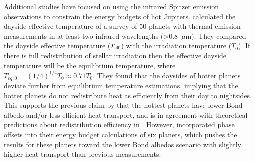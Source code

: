 Additional studies have focused on using the infrared Spitzer emission observations to constrain the energy budgets of hot Jupiters. \citet{Schwartz2015} calculated the dayside effective temperature of a survey of 50 planets with thermal emission measurements in at least two infrared wavelengths (>0.8~$\mu$m). They compared the dayside effective temperature ($T_{\rm eff}$) with the irradiation temperature ($T_0$). If there is full redistribution of stellar irradiation then the effective dayside temperature will be the equilibrium temperature, where $T_{eq,\textit{0}} = (1/4)^{1/4} T_0 \approx 0.71T_0$. They found that the daysides of hotter planets deviate further from equilibrium temperature estimations, implying that the hotter planets do not redistribute heat as efficiently from their day to nightsides. This supports the previous claim by \citet{Cowan2011b} that the hottest planets have lower Bond albedo and/or less efficient heat transport, and is in agreement with theoretical predictions about redistribution efficiency in \citet{Perez-Becker2013}. However, \citet{Schwartz2017} incorporated phase offsets into their energy budget calculations of six planets, which pushes the results for these planets toward the lower Bond albedos scenario with slightly higher heat transport than previous measurements.

